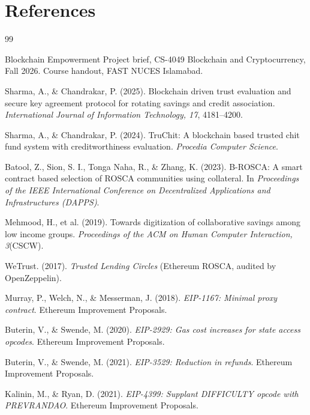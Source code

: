 \section*{References}
\begingroup
\renewcommand{\section}[2]{}%
\small
\begin{thebibliography}{99}
\setlength{\itemsep}{3pt}

Blockchain Empowerment Project brief, CS-4049 Blockchain and Cryptocurrency, Fall 2026. Course handout,
FAST NUCES Islamabad.

Sharma, A., \& Chandrakar, P. (2025). Blockchain driven trust evaluation and secure key agreement protocol
for rotating savings and credit association. \emph{International Journal of Information Technology, 17},
4181--4200.

Sharma, A., \& Chandrakar, P. (2024). TruChit: A blockchain based trusted chit fund system with
creditworthiness evaluation. \emph{Procedia Computer Science}.

Batool, Z., Sion, S. I., Tonga Naha, R., \& Zhang, K. (2023). B-ROSCA: A smart contract based selection of
ROSCA communities using collateral. In \emph{Proceedings of the IEEE International Conference on
Decentralized Applications and Infrastructures (DAPPS)}.

Mehmood, H., et al. (2019). Towards digitization of collaborative savings among low income groups.
\emph{Proceedings of the ACM on Human Computer Interaction, 3}(CSCW).

WeTrust. (2017). \emph{Trusted Lending Circles} (Ethereum ROSCA, audited by OpenZeppelin).

Murray, P., Welch, N., \& Messerman, J. (2018). \emph{EIP-1167: Minimal proxy contract}. Ethereum
Improvement Proposals.

Buterin, V., \& Swende, M. (2020). \emph{EIP-2929: Gas cost increases for state access opcodes}. Ethereum
Improvement Proposals.

Buterin, V., \& Swende, M. (2021). \emph{EIP-3529: Reduction in refunds}. Ethereum Improvement Proposals.

Kalinin, M., \& Ryan, D. (2021). \emph{EIP-4399: Supplant DIFFICULTY opcode with PREVRANDAO}. Ethereum
Improvement Proposals.


\end{thebibliography}
